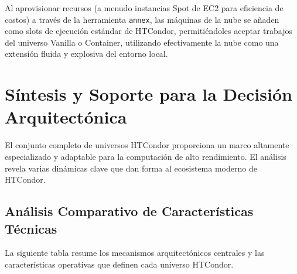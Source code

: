 Al aprovisionar recursos (a menudo instancias Spot de EC2 para eficiencia de costos) a través de la herramienta \texttt{annex}, las máquinas de la nube se añaden como slots de ejecución estándar de HTCondor, permitiéndoles aceptar trabajos del universo Vanilla o Container, utilizando efectivamente la nube como una extensión fluida y explosiva del entorno local.

\section{Síntesis y Soporte para la Decisión Arquitectónica}

El conjunto completo de universos HTCondor proporciona un marco altamente especializado y adaptable para la computación de alto rendimiento. El análisis revela varias dinámicas clave que dan forma al ecosistema moderno de HTCondor.

\subsection{Análisis Comparativo de Características Técnicas}

La siguiente tabla resume los mecanismos arquitectónicos centrales y las características operativas que definen cada universo HTCondor.

